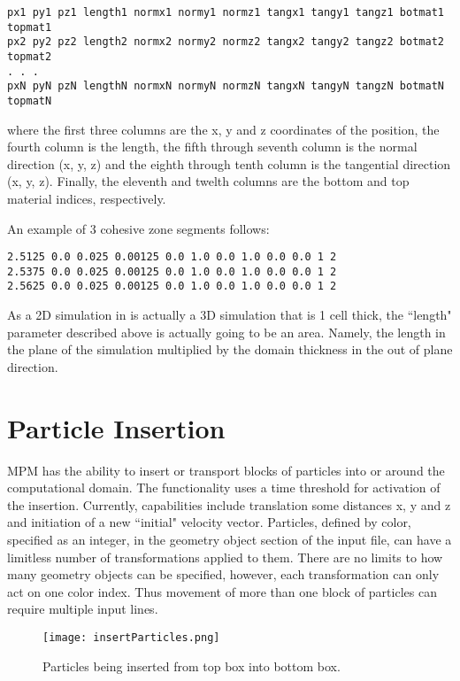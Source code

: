 \begin{lstlisting}[backgroundcolor=\color{background}]
px1 py1 pz1 length1 normx1 normy1 normz1 tangx1 tangy1 tangz1 botmat1 topmat1
px2 py2 pz2 length2 normx2 normy2 normz2 tangx2 tangy2 tangz2 botmat2 topmat2
. . .
pxN pyN pzN lengthN normxN normyN normzN tangxN tangyN tangzN botmatN topmatN
\end{lstlisting}

where the first three columns are the x, y and z coordinates of the position, 
the fourth column is the length, the fifth through seventh column is the normal
direction (x, y, z) and the eighth through tenth column is the tangential
direction (x, y, z).  Finally, the eleventh and twelth columns are the bottom
and top material indices, respectively.

An example of 3 cohesive zone segments follows:

\begin{lstlisting}[backgroundcolor=\color{background}]
2.5125 0.0 0.025 0.00125 0.0 1.0 0.0 1.0 0.0 0.0 1 2
2.5375 0.0 0.025 0.00125 0.0 1.0 0.0 1.0 0.0 0.0 1 2
2.5625 0.0 0.025 0.00125 0.0 1.0 0.0 1.0 0.0 0.0 1 2
\end{lstlisting}

As a 2D simulation in \Vaango is actually a 3D simulation that is 1 cell thick,
the ``length" parameter described above is actually going to be an area.
Namely, the length in the plane of the simulation multiplied by the domain
thickness in the out of plane direction.

\section{Particle Insertion} \label{Sec:ParticleInsert}
MPM has the ability to insert or transport blocks of particles into or
 around the computational domain.  The functionality uses a time threshold for 
activation of the insertion. Currently, capabilities include translation some 
distances x, y and z and initiation of a new ``initial" velocity vector.  Particles, 
defined by color, specified as an integer, in the geometry object section of the 
input file, can have a limitless number of transformations applied to them.  
There are no limits to how many geometry objects can be specified, however,
each transformation can only act on one color index.  Thus movement of more than
one block of particles can require multiple input lines.

\begin{figure}[htb!]
  \center
  \texttt{[image: insertParticles.png]}
  \caption{Particles being inserted from top box into bottom box.}
  \label{figinsertparticles}
\end{figure}
 
